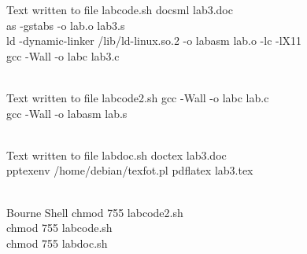 \documentclass{article}
\begin{document}
\begin{GFT}{Text written to file labcode.sh}
\+docsml lab3.doc\\
\+as -gstabs -o lab.o lab3.s\\
\+ld -dynamic-linker /lib/ld-linux.so.2 -o labasm lab.o -lc -lX11\\
\+gcc -Wall -o labc lab3.c\\
\+\\
\end{GFT}
\begin{GFT}{Text written to file labcode2.sh}
\+gcc -Wall -o labc lab.c\\
\+gcc -Wall -o labasm lab.s\\
\+\\
\end{GFT}
\begin{GFT}{Text written to file labdoc.sh}
\+doctex lab3.doc\\
\+pptexenv /home/debian/texfot.pl pdflatex lab3.tex\\
\+\\
\end{GFT}
\begin{GFT}{Bourne Shell}
\+chmod 755 labcode2.sh\\
\+chmod 755 labcode.sh\\
\+chmod 755 labdoc.sh\\
\+\\
\end{GFT}
\end{document}
